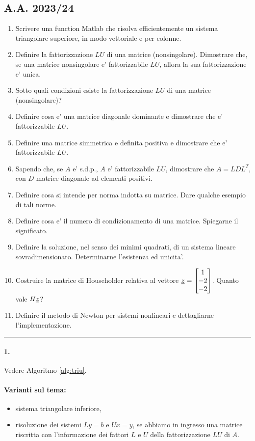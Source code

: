 \subsection{A.A. 2023/24}
\begin{enumerate}
	\item Scrivere una function Matlab che risolva efficientemente un sistema triangolare superiore, in modo vettoriale e per colonne.
	\item Definire la fattorizzazione $LU$ di una matrice (\gls{nonsingolare}). Dimostrare che, se una matrice nonsingolare e' fattorizzabile $LU$, allora la sua fattorizzazione e' unica.
	\item Sotto quali condizioni esiste la fattorizzazione $LU$ di una matrice (nonsingolare)?
	\item Definire cosa e' una matrice diagonale dominante e dimostrare che e' fattorizzabile $LU$.
	\item Definire una matrice simmetrica e definita positiva e dimostrare che e' fattorizzabile $LU$.
	\item Sapendo che, se $A$ e' s.d.p., $A$ e' fattorizzabile $LU$, dimostrare che $A=LDL^T$, con $D$ matrice diagonale ad elementi positivi.
	\item Definire cosa si intende per norma indotta su matrice. Dare qualche esempio di tali norme.
	\item Definire cosa e' il numero di condizionamento di una matrice. Spiegarne il significato.
	\item Definire la soluzione, nel senso dei minimi quadrati, di un sistema lineare sovradimensionato. Determinarne l'esistenza ed unicita'.
	\item Costruire la matrice di Householder relativa al vettore $\uline z = \begin{bmatrix}
		1\\
		-2\\
		-2
	\end{bmatrix}$. Quanto vale $H\uline z$?
	\item Definire il metodo di Newton per sistemi nonlineari e dettagliarne l'implementazione.
\end{enumerate}

\hrule

\paragraph{1.} Vedere Algoritmo \ref{alg:triu}.
\paragraph{Varianti sul tema:}
\begin{itemize}
	\item sistema triangolare inferiore,
	\item risoluzione dei sistemi $Ly=b$ e $Ux=y$, se abbiamo in ingresso una matrice riscritta con l'informazione dei fattori $L$ e $U$ della fattorizzazione $LU$ di $A$.
\end{itemize}

